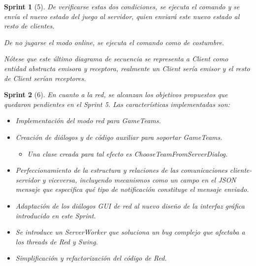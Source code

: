 \documentclass{article}
\theoremstyle{break}
\newtheorem*{sprint}{Sprint}
\begin{document}
\begin{sprint}[5]
De verificarse estas dos condiciones, se ejecuta el comando y se envía el nuevo estado del juego al servidor, quien enviará este nuevo estado al resto de clientes.

De no jugarse el modo online, se ejecuta el comando como de costumbre.

Nótese que este último diagrama de secuencia se representa a Client como entidad abstracta emisora y receptora, realmente un Client sería emisor y el resto de Client serían receptores.
\end{sprint}

\begin{sprint}[6]
En cuanto a la red, se alcanzan los objetivos propuestos que quedaron pendientes en el Sprint 5. Las características implementadas son:

\begin{itemize}
\item Implementación del modo red para GameTeams.

\item Creación de diálogos y de código auxiliar para soportar GameTeams.

\begin{itemize}
\item Una clase creada para tal efecto es ChooseTeamFromServerDialog.
\end{itemize}


\item Perfeccionamiento de la estructura y relaciones de las comunicaciones cliente-servidor y viceversa, incluyendo mecanismos como un campo en el JSON mensaje que especifica qué tipo de notificación constituye el mensaje enviado.

\item Adaptación de los diálogos GUI de red al nuevo diseño de la interfaz gráfica introducido en este Sprint.

\item Se introduce un ServerWorker que soluciona un bug complejo que afectaba a los threads de Red y Swing.

\item Simplificación y refactorización del código de Red.


\end{itemize}
\end{sprint}
\end{document}
